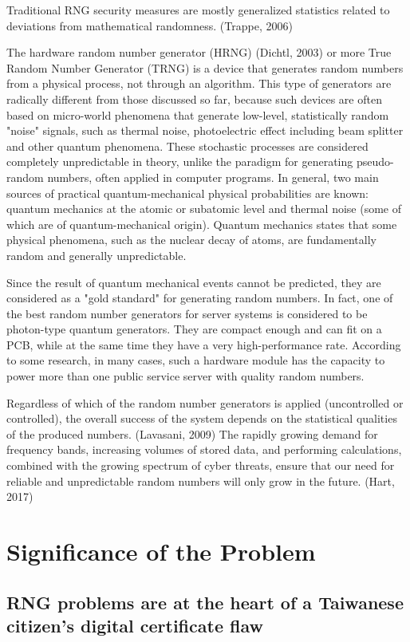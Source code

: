 \documentclass[graybox]{svmult}
\begin{document}
Traditional RNG security measures are mostly generalized statistics related to deviations from mathematical randomness. (Trappe, 2006)

The hardware random number generator (HRNG) (Dichtl, 2003) or more True Random Number Generator (TRNG) is a device that generates random numbers from a physical process, not through an algorithm. This type of generators are radically different from those discussed so far, because such devices are often based on micro-world phenomena that generate low-level, statistically random "noise" signals, such as thermal noise, photoelectric effect including beam splitter and other quantum phenomena. These stochastic processes are considered completely unpredictable in theory, unlike the paradigm for generating pseudo-random numbers, often applied in computer programs. In general, two main sources of practical quantum-mechanical physical probabilities are known: quantum mechanics at the atomic or subatomic level and thermal noise (some of which are of quantum-mechanical origin). Quantum mechanics states that some physical phenomena, such as the nuclear decay of atoms, are fundamentally random and generally unpredictable.

Since the result of quantum mechanical events cannot be predicted, they are considered as a "gold standard" for generating random numbers. In fact, one of the best random number generators for server systems is considered to be photon-type quantum generators. They are compact enough and can fit on a PCB, while at the same time they have a very high-performance rate. According to some research, in many cases, such a hardware module has the capacity to power more than one public service server with quality random numbers. 

Regardless of which of the random number generators is applied (uncontrolled or controlled), the overall success of the system depends on the statistical qualities of the produced numbers. (Lavasani, 2009) The rapidly growing demand for frequency bands, increasing volumes of stored data, and performing calculations, combined with the growing spectrum of cyber threats, ensure that our need for reliable and unpredictable random numbers will only grow in the future. (Hart, 2017) 

\section{Significance of the Problem}
\label{sec:2}

\subsection{RNG problems are at the heart of a Taiwanese citizen's digital certificate flaw}
\label{sub-sec:2-1}
\end{document}
